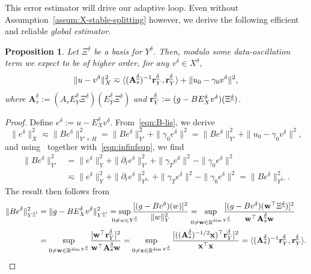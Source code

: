 \documentclass[11pt,a4paper,oneside,english]{amsart}
\numberwithin{equation}{section}
\numberwithin{theorem}{section}
\newtheorem{prop}[theorem]{Proposition}
\theoremstyle{definition}
\newcommand{\R}{\mathbb{R}}
\newcommand{\la}{\langle}
\newcommand{\ra}{\rangle}
\newcommand{\udelta}{{\underline{\delta}}}
\newcommand{\jw}[1]{{\color{red}{JW: #1}}}
\begin{document}
This error estimator will drive our adaptive loop. Even without Assumption~\ref{assum:X-stable-splitting} however, we derive the following efficient and reliable \emph{global estimator}.
\begin{prop}
  \label{prop:global-apost}
  Let $\Xi^{\udelta}$ be a basis for $Y^{\udelta}$. Then, modulo some data-oscillation
  term we expect to be of higher order, for any $v^\delta \in X^\delta$,
  \[
    \|u - v^\delta\|_X^2 \eqsim \la (\mathbf A_s^{\udelta})^{-1}{\bf r}^\udelta_Y, {\bf r}^\udelta_Y \ra + \|u_0 - \gamma_0 v^\delta\|^2,
  \]
  where $\mathbf A_s^{\udelta} := (A_s E_Y^{\udelta} \Xi^{\udelta})(E_Y^{\udelta} \Xi^{\udelta})$ and ${\bf r}^\udelta_Y := (g - B E_X^{\delta} v^\delta)(\Xi^\udelta)$.
  \jw{zouden we in staat zijn om de constantes hidden in $\eqsim$ hierboven, precies te maken? Mss de data oscillation erin?}
\end{prop}
\begin{proof}
  Define $e^\delta := u - E_X^\delta v^\delta$. From~\eqref{eqn:B-lis}, we derive
  \[
    \|e^\delta\|_X^2 \eqsim \|B e^\delta\|_{Y' \times H}^2
    = \|B e^\delta\|_{Y'}^2 + \|\gamma_0 e^\delta\|^2 = \|B e^\delta\|_{Y'}^2 + \|u_0 - \gamma_0 v^\delta\|^2,
  \]
  and using~\cite[Lemma 3.4]{Stevenson2020a} together with~\eqref{eqn:infinfsup}, we find
  \begin{align*}
    \|B e^\delta\|_{Y'}^2 &= \|e^\delta\|_Y^2 + \|\partial_t e^\delta\|_{Y'}^2 + \|\gamma_T e^\delta\|^2 - \|\gamma_0 e^\delta\|^2 \\
    &\eqsim \|e^\delta\|_Y^2 + \|\partial_t e^\delta\|_{{Y^\udelta}'}^2 + \|\gamma_T e^\delta\|^2 - \|\gamma_0 e^\delta\|^2 = \|B e^\delta\|_{{Y^\udelta}'}^2.
  \end{align*}
  The result then follows from
  \begin{align*}
    \|B e^\delta\|_{{Y^\udelta}'}^2 &= \|g - BE_X^\delta v^\delta\|_{{Y^\udelta}'}^2
    = \sup_{\mathclap{0 \not= w \in Y^\udelta}} \frac{[(g - Bv^\delta)(w)]^2}{\|w\|_Y^2} = ~~\sup_{\mathclap{0 \not= {\bf w} \in \R^{\dim Y^\udelta}}} ~~\frac{[(g - Bv^\delta)({\bf w}^\top \Xi^\udelta)]^2}{{\bf w}^\top {\bf A}_s^\udelta {\bf w}} \\
    &= \sup_{0 \not= {\bf w} \in \R^{\dim Y^\udelta}} \frac{[{\bf w}^\top {\bf r}^\udelta_Y]^2}{{\bf w}^\top {\bf A}_s^\udelta {\bf w}} = \sup_{0 \not= {\bf x} \in \R^{\dim Y^\udelta}} \frac{[(({\bf A}_s^\udelta)^{-1/2}{\bf x})^\top {\bf r}^\udelta_Y]^2}{{\bf x}^\top {\bf x}} = \la ({\bf A}_s^\udelta)^{-1} {\bf r}_Y^\udelta, {\bf r}_Y^\udelta \ra. \qedhere
  \end{align*}
\end{proof}
\end{document}
